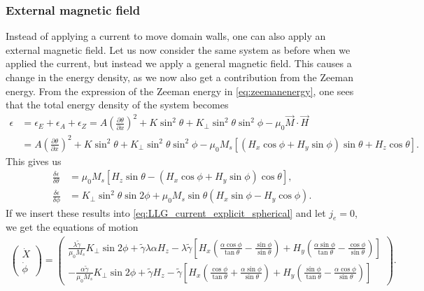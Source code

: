 \documentclass[12pt, a4paper, twoside, openright]{article}		%
\numberwithin{equation}{section}
\begin{document}
\subsubsection{External magnetic field}
Instead of applying a current to move domain walls, one can also apply an external magnetic field. Let us now consider the same system as before when we applied the current, but instead we apply a general magnetic field. This causes a change in the energy density, as we now also get a contribution from the Zeeman energy. From the expression of the Zeeman energy in \eqref{eq:zeemanenergy}, one sees that the total energy density of the system becomes
\begin{align}
\nonumber \epsilon&=\epsilon_E+\epsilon_A+\epsilon_Z=A \left(\frac{\partial \theta}{\partial x}\right)^2 + K\sin^2\theta + K_{\perp} \sin^2\theta\sin^2\phi-\mu_0\vec{M}\cdot\vec{H} \\
&= A \left(\frac{\partial \theta}{\partial x}\right)^2 + K\sin^2\theta + K_{\perp} \sin^2\theta\sin^2\phi-\mu_0M_s\left[(H_x\cos\phi+H_y\sin\phi)\sin\theta+ H_z\cos\theta\right].
\end{align}
This gives us
\begin{align}
\frac{\delta \epsilon}{\delta \theta} &= \mu_0M_s\left[H_z\sin\theta - (H_x\cos\phi+H_y\sin\phi)\cos\theta \right], \\
\frac{\delta \epsilon}{\delta \phi} &= K_{\perp}\sin^2\theta\sin2\phi + \mu_0M_s\sin\theta(H_x\sin\phi-H_y\cos\phi).
\end{align}
If we insert these results into \eqref{eq:LLG_current_explicit_spherical} and let $j_e=0$, we get the equations of motion
\begin{align}
\label{eq:xdot_phidot_hfield}
\begin{pmatrix}
\dot{X} \\ \dot{\phi}
\end{pmatrix} = 
\begin{pmatrix}
\frac{\lambda \tilde{\gamma}}{\mu_0M_s} K_{\perp} \sin2\phi  + \tilde{\gamma}\lambda\alpha H_z - \lambda\tilde{\gamma}\left[H_x(\frac{\alpha\cos\phi}{\tan\theta}-\frac{\sin\phi}{\sin\theta}) + H_y(\frac{\alpha\sin\phi}{\tan\theta}-\frac{\cos\phi}{\sin\theta}) \right] \\
-\frac{\alpha\tilde{\gamma}}{\mu_0M_s} K_{\perp}\sin2\phi + \tilde{\gamma} H_z - \tilde{\gamma}\left[H_x(\frac{\cos\phi}{\tan\theta}+\frac{\alpha\sin\phi}{\sin\theta}) + H_y(\frac{\sin\phi}{\tan\theta}-\frac{\alpha\cos\phi}{\sin\theta}) \right]
\end{pmatrix}.
\end{align}
\end{document}
